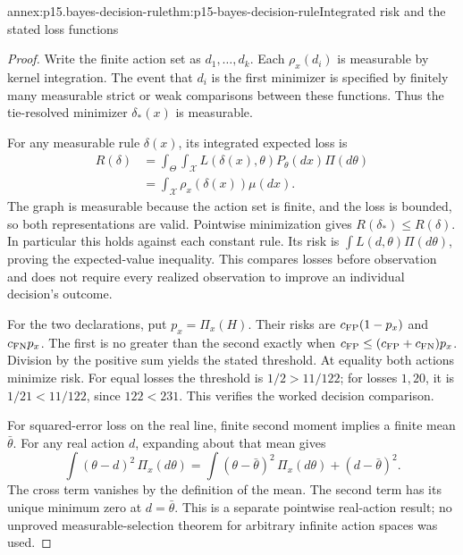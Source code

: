 \begin{annexitem}{annex:p15.bayes-decision-rule}{thm:p15-bayes-decision-rule}{Integrated risk and the stated loss functions}
\begin{proof}
Write the finite action set as \(d_1,\ldots,d_k\).
Each \(\rho_x(d_i)\) is measurable by kernel integration.
The event that \(d_i\) is the first minimizer is specified
by finitely many measurable strict or weak comparisons
between these functions. Thus the tie-resolved minimizer
\(\delta_*(x)\) is measurable.

For any measurable rule \(\delta(x)\), its integrated
expected loss is
\[
 \begin{split}
 R(\delta)&=\int_\Theta\int_{\mathcal X}
                L(\delta(x),\theta)P_\theta(dx)\Pi(d\theta)\\
 &=\int_{\mathcal X}\rho_x(\delta(x))\mu(dx).
 \end{split}
\]
The graph is measurable because the action set is finite,
and the loss is bounded, so both representations are valid.
Pointwise minimization gives \(R(\delta_*)\leq R(\delta)\).
In particular this holds against each constant rule.
Its risk is \(\int L(d,\theta)\Pi(d\theta)\), proving the
expected-value inequality. This compares losses before
observation and does not require every realized observation
to improve an individual decision's outcome.

For the two declarations, put \(p_x=\Pi_x(H)\).
Their risks are \(c_{\rm FP}(1-p_x)\) and
\(c_{\rm FN}p_x\). The first is no greater than the second
exactly when
\(c_{\rm FP}\leq(c_{\rm FP}+c_{\rm FN})p_x\).
Division by the positive sum yields the stated threshold.
At equality both actions minimize risk.
For equal losses the threshold is \(1/2>11/122\);
for losses \(1,20\), it is \(1/21<11/122\), since
\(122<231\). This verifies the worked decision comparison.

For squared-error loss on the real line, finite second
moment implies a finite mean \(\bar\theta\).
For any real action \(d\), expanding about that mean gives
\[
 \int(\theta-d)^2\,\Pi_x(d\theta)
   =\int(\theta-\bar\theta)^2\,\Pi_x(d\theta)
                       +(d-\bar\theta)^2.
\]
The cross term vanishes by the definition of the mean.
The second term has its unique minimum zero at
\(d=\bar\theta\). This is a separate pointwise real-action
result; no unproved measurable-selection theorem for
arbitrary infinite action spaces was used.
\end{proof}
\end{annexitem}

